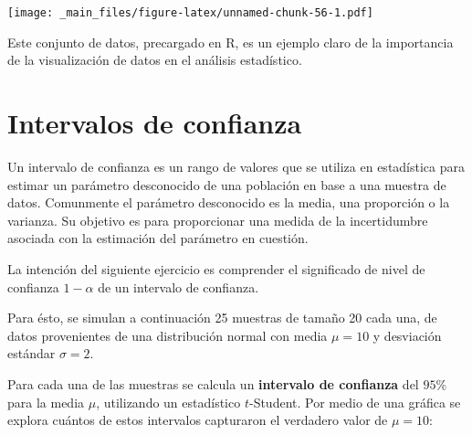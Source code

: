 \documentclass[
]{book}
\begin{document}
\texttt{[image: \_main\_files/figure-latex/unnamed-chunk-56-1.pdf]}

Este conjunto de datos, precargado en R, es un ejemplo claro de la importancia de la visualización de datos en el análisis estadístico.

\hypertarget{intervalos-de-confianza}{%
\chapter{Intervalos de confianza}\label{intervalos-de-confianza}}

Un intervalo de confianza es un rango de valores que se utiliza en estadística para estimar un parámetro desconocido de una población en base a una muestra de datos. Comunmente el parámetro desconocido es la media, una proporción o la varianza. Su objetivo es para proporcionar una medida de la incertidumbre asociada con la estimación del parámetro en cuestión.

La intención del siguiente ejercicio es comprender el significado de nivel de confianza \(1-\alpha\) de un intervalo de confianza.

Para ésto, se simulan a continuación 25 muestras de tamaño 20 cada una, de datos provenientes de una distribución normal con media \(\mu = 10\) y desviación estándar \(\sigma = 2\).

Para cada una de las muestras se calcula un \textbf{intervalo de confianza} del \(95\)\% para la media \(\mu\), utilizando un estadístico \(t\)-Student. Por medio de una gráfica se explora cuántos de estos intervalos capturaron el verdadero valor de \(\mu =10\):
\end{document}
